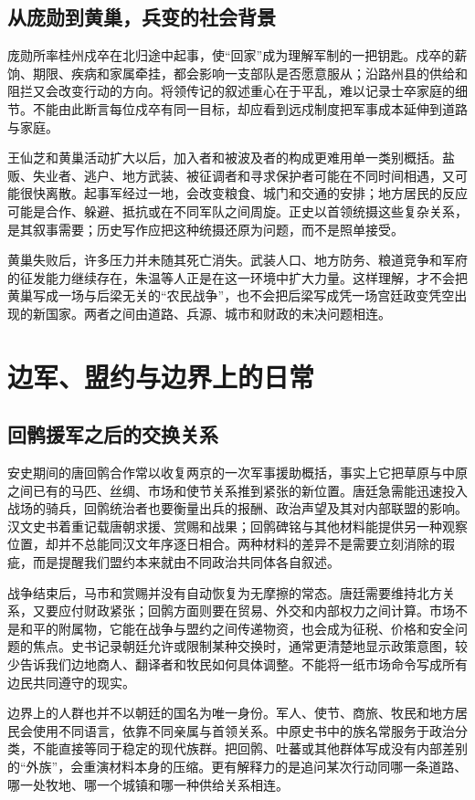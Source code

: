 \subsection{从庞勋到黄巢，兵变的社会背景}
庞勋所率桂州戍卒在北归途中起事，使“回家”成为理解军制的一把钥匙。戍卒的薪饷、期限、疾病和家属牵挂，都会影响一支部队是否愿意服从；沿路州县的供给和阻拦又会改变行动的方向。将领传记的叙述重心在于平乱，难以记录士卒家庭的细节。不能由此断言每位戍卒有同一目标，却应看到远戍制度把军事成本延伸到道路与家庭。

王仙芝和黄巢活动扩大以后，加入者和被波及者的构成更难用单一类别概括。盐贩、失业者、逃户、地方武装、被征调者和寻求保护者可能在不同时间相遇，又可能很快离散。起事军经过一地，会改变粮食、城门和交通的安排；地方居民的反应可能是合作、躲避、抵抗或在不同军队之间周旋。正史以首领统摄这些复杂关系，是其叙事需要；历史写作应把这种统摄还原为问题，而不是照单接受。

黄巢失败后，许多压力并未随其死亡消失。武装人口、地方防务、粮道竞争和军府的征发能力继续存在，朱温等人正是在这一环境中扩大力量。这样理解，才不会把黄巢写成一场与后梁无关的“农民战争”，也不会把后梁写成凭一场宫廷政变凭空出现的新国家。两者之间由道路、兵源、城市和财政的未决问题相连。

\section{边军、盟约与边界上的日常}

\subsection{回鹘援军之后的交换关系}
安史期间的唐回鹘合作常以收复两京的一次军事援助概括，事实上它把草原与中原之间已有的马匹、丝绸、市场和使节关系推到紧张的新位置。唐廷急需能迅速投入战场的骑兵，回鹘统治者也要衡量出兵的报酬、政治声望及其对内部联盟的影响。汉文史书着重记载唐朝求援、赏赐和战果；回鹘碑铭与其他材料能提供另一种观察位置，却并不总能同汉文年序逐日相合。两种材料的差异不是需要立刻消除的瑕疵，而是提醒我们盟约本来就由不同政治共同体各自叙述。

战争结束后，马市和赏赐并没有自动恢复为无摩擦的常态。唐廷需要维持北方关系，又要应付财政紧张；回鹘方面则要在贸易、外交和内部权力之间计算。市场不是和平的附属物，它能在战争与盟约之间传递物资，也会成为征税、价格和安全问题的焦点。史书记录朝廷允许或限制某种交换时，通常更清楚地显示政策意图，较少告诉我们边地商人、翻译者和牧民如何具体调整。不能将一纸市场命令写成所有边民共同遵守的现实。

边界上的人群也并不以朝廷的国名为唯一身份。军人、使节、商旅、牧民和地方居民会使用不同语言，依靠不同亲属与首领关系。中原史书中的族名常服务于政治分类，不能直接等同于稳定的现代族群。把回鹘、吐蕃或其他群体写成没有内部差别的“外族”，会重演材料本身的压缩。更有解释力的是追问某次行动同哪一条道路、哪一处牧地、哪一个城镇和哪一种供给关系相连。

